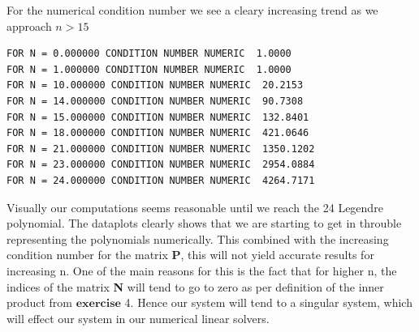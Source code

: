 \documentclass[a4paper,norsk]{article}
\begin{document}
For the numerical condition number we see a cleary increasing trend as we approach $n > 15$
\begin{lstlisting}[style=terminal]
FOR N = 0.000000 CONDITION NUMBER NUMERIC  1.0000
FOR N = 1.000000 CONDITION NUMBER NUMERIC  1.0000
FOR N = 10.000000 CONDITION NUMBER NUMERIC  20.2153
FOR N = 14.000000 CONDITION NUMBER NUMERIC  90.7308
FOR N = 15.000000 CONDITION NUMBER NUMERIC  132.8401
FOR N = 18.000000 CONDITION NUMBER NUMERIC  421.0646
FOR N = 21.000000 CONDITION NUMBER NUMERIC  1350.1202
FOR N = 23.000000 CONDITION NUMBER NUMERIC  2954.0884
FOR N = 24.000000 CONDITION NUMBER NUMERIC  4264.7171
\end{lstlisting}

Visually our computations seems reasonable until we reach the 24 Legendre polynomial. The dataplots clearly shows that we are starting to get in throuble representing the polynomials numerically. This combined with the increasing condition number for the matrix \textbf{P}, this will not yield accurate results for increasing n. One of the main reasons for this is the fact that for higher n, the indices of the matrix \textbf{N} will tend to go to zero as per definition of the inner product from 
$\mathbf{exercise}$ 4. Hence our system will tend to a singular system, which will effect our system in our numerical linear solvers.
\end{document}
